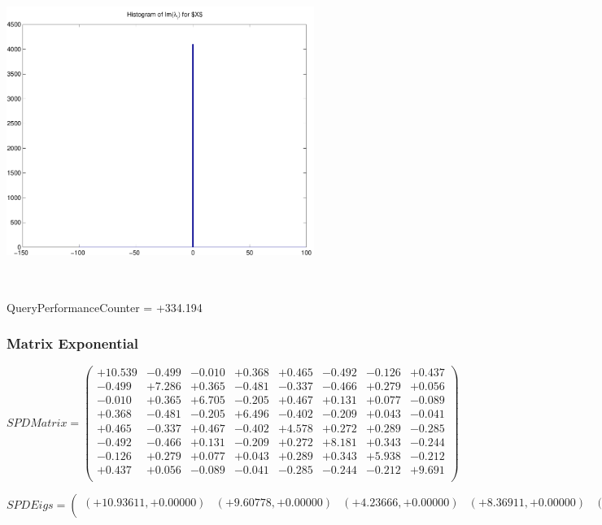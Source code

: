 \documentclass[9pt]{article}
\theoremstyle{plain}
\theoremstyle{definition}
\theoremstyle{remark}
\numberwithin{equation}{section}
\begin{document}
\includegraphics[width=10.0cm,height=10.0cm]{Im_lambda_n.pdf}

QueryPerformanceCounter  =  +334.194
\subsubsection{Matrix Exponential }
$SPD Matrix = \left(
\begin{array}{
cccccccc}
+10.539 & -0.499 & -0.010 & +0.368 & +0.465 & -0.492 & -0.126 & +0.437 \\
-0.499 & +7.286 & +0.365 & -0.481 & -0.337 & -0.466 & +0.279 & +0.056 \\
-0.010 & +0.365 & +6.705 & -0.205 & +0.467 & +0.131 & +0.077 & -0.089 \\
+0.368 & -0.481 & -0.205 & +6.496 & -0.402 & -0.209 & +0.043 & -0.041 \\
+0.465 & -0.337 & +0.467 & -0.402 & +4.578 & +0.272 & +0.289 & -0.285 \\
-0.492 & -0.466 & +0.131 & -0.209 & +0.272 & +8.181 & +0.343 & -0.244 \\
-0.126 & +0.279 & +0.077 & +0.043 & +0.289 & +0.343 & +5.938 & -0.212 \\
+0.437 & +0.056 & -0.089 & -0.041 & -0.285 & -0.244 & -0.212 & +9.691 \\
\end{array}
\right)$ \newline 

$SPD Eigs = \left(
\begin{array}{
cccccccc}
(+10.93611,+0.00000) & (+9.60778,+0.00000) & (+4.23666,+0.00000) & (+8.36911,+0.00000) & (+7.56229,+0.00000) & (+5.82791,+0.00000) & (+6.54198,+0.00000) & (+6.33139,+0.00000) \\
\end{array}
\right)$ \newline 
\end{document}
